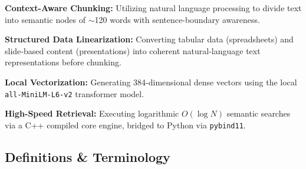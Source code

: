 \documentclass[12pt, a4paper]{article}
\begin{document}
\begin{prolist}
    \item \textbf{Context-Aware Chunking:} Utilizing natural language
    processing to divide text into semantic nodes of $\sim$120 words with
    sentence-boundary awareness.

    \item \textbf{Structured Data Linearization:} Converting tabular data
    (spreadsheets) and slide-based content (presentations) into coherent
    natural-language text representations before chunking.

    \item \textbf{Local Vectorization:} Generating 384-dimensional dense
    vectors using the local \texttt{all-MiniLM-L6-v2} transformer model.

    \item \textbf{High-Speed Retrieval:} Executing logarithmic $O(\log N)$
    semantic searches via a C++ compiled core engine, bridged to Python via
    \texttt{pybind11}.
\end{prolist}

\subsection{Definitions \& Terminology}
\end{document}
